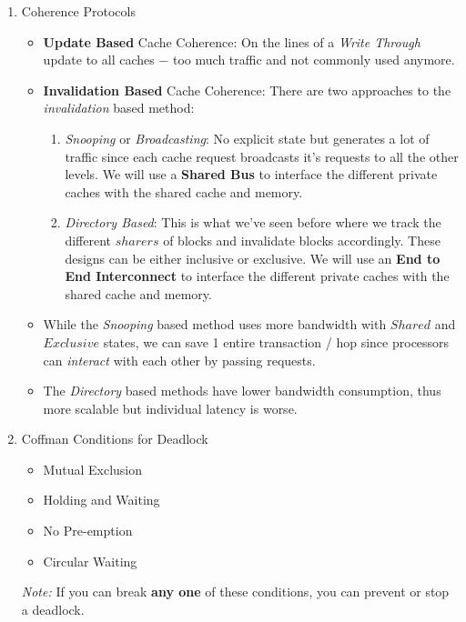 \documentclass[12pt]{article}
\newenvironment{QandA}{\begin{enumerate}[label=\bfseries\arabic*.]\bfseries}
                      {\end{enumerate}}
\newenvironment{answered}{\par\quad\normalfont}{}
\begin{document}
\begin{QandA}
\item Coherence Protocols
\begin{answered}
\vspace{-0.85cm}
\begin{itemize}
    \item \textbf{Update Based} Cache Coherence: On the lines of a \textit{Write Through} update to all caches $-$ too much traffic and not commonly used anymore.
    \item \textbf{Invalidation Based} Cache Coherence: There are two approaches to the \textit{invalidation} based method:
    \begin{enumerate}
        \item \textit{Snooping} or \textit{Broadcasting}: No explicit state but generates a lot of traffic since each cache request broadcasts it's requests to all the other levels. We will use a \textbf{Shared Bus} to interface the different private caches with the shared cache and memory. 
        \item \textit{Directory Based}: This is what we've seen before where we track the different $sharers$ of blocks and invalidate blocks accordingly. These designs can be either inclusive or exclusive. We will use an \textbf{End to End Interconnect} to interface the different private caches with the shared cache and memory. 
    \end{enumerate}
    \item While the \textit{Snooping} based method uses more bandwidth with $Shared$ and $Exclusive$ states, we can save 1 entire transaction / hop since processors can \textit{interact} with each other by passing requests. 
    \item The \textit{Directory} based methods have lower bandwidth consumption, thus more scalable but individual latency is worse. 
\end{itemize}
\end{answered}

\newpage

\item Coffman Conditions for Deadlock
\begin{answered}
\vspace{-0.85cm}
\begin{itemize}
    \item Mutual Exclusion
    \item Holding and Waiting
    \item No Pre-emption
    \item Circular Waiting
\end{itemize}
\textit{Note:} If you can break \textbf{any one} of these conditions, you can prevent or stop a deadlock. 


\end{answered}
\end{QandA}
\end{document}
